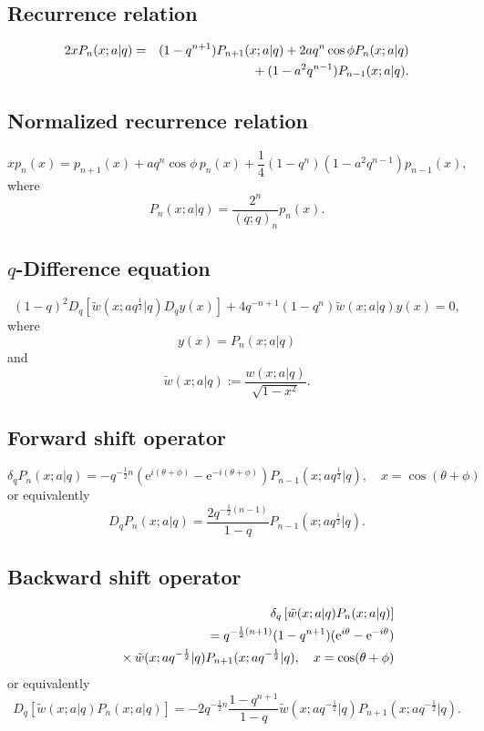 \documentclass[envcountchap,graybox]{svmono}
\newcommand{\mathindent}{\hspace{7.5mm}}
\newcommand{\e}{\textrm{e}}
\begin{document}
\subsection*{Recurrence relation}
\begin{eqnarray}
\label{RecqMP}
2xP_n(x;a|q)&=&(1-q^{n+1})P_{n+1}(x;a|q)+2aq^n\cos\phi P_n(x;a|q)\nonumber\\
& &{}\mathindent{}+(1-a^2q^{n-1})P_{n-1}(x;a|q).
\end{eqnarray}

\newpage

\subsection*{Normalized recurrence relation}
\begin{equation}
\label{NormRecqMP}
xp_n(x)=p_{n+1}(x)+aq^n\cos\phi\,p_n(x)+\frac{1}{4}(1-q^n)(1-a^2q^{n-1})p_{n-1}(x),
\end{equation}
where
$$P_n(x;a|q)=\frac{2^n}{(q;q)_n}p_n(x).$$

\subsection*{$q$-Difference equation}
\begin{equation}
\label{dvqMP}
(1-q)^2D_q\left[{\tilde w}(x;aq^{\frac{1}{2}}|q)D_qy(x)\right]
+4q^{-n+1}(1-q^n){\tilde w}(x;a|q)y(x)=0,
\end{equation}
where
$$y(x)=P_n(x;a|q)$$
and
$${\tilde w}(x;a|q):=\frac{w(x;a|q)}{\sqrt{1-x^2}}.$$

\subsection*{Forward shift operator}
\begin{equation}
\label{shift1qMPI}
\delta_qP_n(x;a|q)=-q^{-\frac{1}{2}n}(\e^{i(\theta+\phi)}-\e^{-i(\theta+\phi)})
P_{n-1}(x;aq^{\frac{1}{2}}|q),\quad x=\cos(\theta+\phi)
\end{equation}
or equivalently
\begin{equation}
\label{shift1qMPII}
D_qP_n(x;a|q)=\frac{2q^{-\frac{1}{2}(n-1)}}{1-q}P_{n-1}(x;aq^{\frac{1}{2}}|q).
\end{equation}

\subsection*{Backward shift operator}
\begin{eqnarray}
\label{shift2qMPI}
& &\delta_q\left[{\tilde w}(x;a|q)P_n(x;a|q)\right]\nonumber\\
& &{}=q^{-\frac{1}{2}(n+1)}(1-q^{n+1})(\e^{i\theta}-\e^{-i\theta})\nonumber\\
& &{}\mathindent{}\times
{\tilde w}(x;aq^{-\frac{1}{2}}|q)P_{n+1}(x;aq^{-\frac{1}{2}}|q),\quad x=\cos(\theta+\phi)
\end{eqnarray}
or equivalently
\begin{equation}
\label{shift2qMPII}
D_q\left[{\tilde w}(x;a|q)P_n(x;a|q)\right]=
-2q^{-\frac{1}{2}n}\frac{1-q^{n+1}}{1-q}{\tilde w}(x;aq^{-\frac{1}{2}}|q)P_{n+1}(x;aq^{-\frac{1}{2}}|q).
\end{equation}
\end{document}
